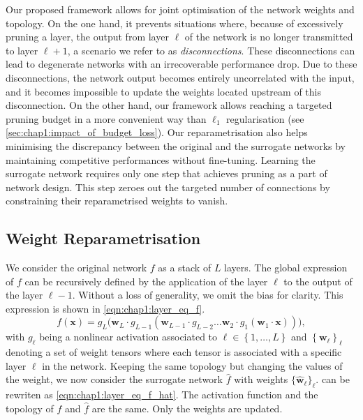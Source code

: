 Our proposed framework allows for joint optimisation of the network weights and
topology. On the one hand, it prevents situations where, because of excessively
pruning a layer, the output from layer $\ell$ of the network is no longer
transmitted to layer $\ell+1$, a scenario we refer to as \emph{disconnections}.
These disconnections can lead to degenerate networks with an irrecoverable
performance drop. Due to these disconnections, the network output becomes
entirely uncorrelated with the input, and it becomes impossible to update the
weights located upstream of this disconnection. On the other hand, our framework
allows reaching a targeted pruning budget in a more convenient way than $\ell_1$
regularisation (see \cref{sec:chap1:impact_of_budget_loss}). Our
reparametrisation also helps minimising the discrepancy between the original and
the surrogate networks by maintaining competitive performances without
fine-tuning. Learning the surrogate network requires only one step that achieves
pruning as a part of network design. This step zeroes out the targeted number of
connections by constraining their reparametrised weights to vanish.


\subsection{Weight Reparametrisation}
\label{sec:chap1:weight_reparam}

We consider the original network $f$ as a stack of $L$ layers. The global
expression of $f$ can be recursively defined by the application of the layer
$\ell$ to the output of the layer $\ell-1$. Without a loss of generality, we
omit the bias for clarity. This expression is shown in
\cref{eqn:chap1:layer_eq_f}.
\begin{equation}
  \label{eqn:chap1:layer_eq_f}
  f(\mathbf{x}) = g_L \big(\mathbf{w}_L \cdot g_{L-1}(\mathbf{w}_{L-1} \cdot g_{L-2} \dots
  \mathbf{w}_2 \cdot g_1(\mathbf{w}_1 \cdot \mathbf{x}))\big),
\end{equation}
\noindent with $g_\ell$ being a nonlinear activation associated to $\ell \in
  \left\{ 1,\dots, L \right\}$ and $\left\{ \mathbf{w}_\ell \right\}_\ell$
denoting a set of weight tensors where each tensor is associated with a specific
layer $\ell$ in the network. Keeping the same topology but changing the values
of the weight, we now consider the surrogate network $\hat{f}$ with weights
$\{\mathbf{\hat{w}}_\ell\}_\ell$.  can be rewriten as
\cref{eqn:chap1:layer_eq_f_hat}. The activation function and the topology of $f$
and $\hat{f}$ are the same. Only the weights are updated.

